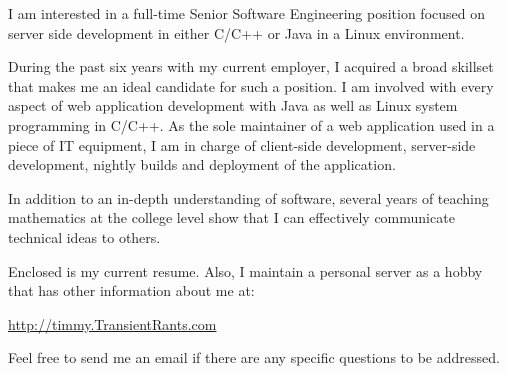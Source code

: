 \documentclass[10pt,stdletter,dateno]{newlfm}
\begin{document}
\begin{newlfm}

I am interested in a full-time Senior Software Engineering position focused on server side development 
in either C/C++ or Java in a Linux environment.

During the past six years with my current employer, I acquired a broad skillset 
that makes me an ideal candidate for such a position.  I am involved with every aspect of web application 
development with Java as well as Linux system programming in C/C++.  As the sole maintainer of a web 
application used in a piece of IT equipment, I am in charge of client-side development, server-side development, 
nightly builds and deployment of the application.  

In addition to an in-depth understanding of software, several years of teaching mathematics at the college level 
show that I can effectively communicate technical ideas to others.

Enclosed is my current resume.  Also, I maintain a personal server as a hobby that has 
other information about me at:

\url{http://timmy.TransientRants.com}

Feel free to send me an email if there are any specific questions to be addressed.

\end{newlfm}
\end{document}
